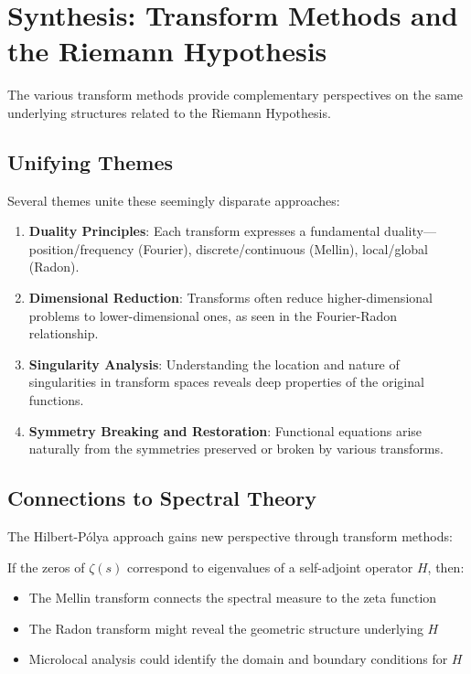 \section{Synthesis: Transform Methods and the Riemann Hypothesis}
\label{sec:synthesis-transforms-rh}

The various transform methods provide complementary perspectives on the same underlying structures related to the Riemann Hypothesis.

\subsection{Unifying Themes}

Several themes unite these seemingly disparate approaches:

\begin{enumerate}
\item \textbf{Duality Principles}: Each transform expresses a fundamental duality—position/frequency (Fourier), discrete/continuous (Mellin), local/global (Radon).

\item \textbf{Dimensional Reduction}: Transforms often reduce higher-dimensional problems to lower-dimensional ones, as seen in the Fourier-Radon relationship.

\item \textbf{Singularity Analysis}: Understanding the location and nature of singularities in transform spaces reveals deep properties of the original functions.

\item \textbf{Symmetry Breaking and Restoration}: Functional equations arise naturally from the symmetries preserved or broken by various transforms.
\end{enumerate}

\subsection{Connections to Spectral Theory}

The Hilbert-Pólya approach gains new perspective through transform methods:

\begin{remark}
If the zeros of $\zeta(s)$ correspond to eigenvalues of a self-adjoint operator $H$, then:
\begin{itemize}
\item The Mellin transform connects the spectral measure to the zeta function
\item The Radon transform might reveal the geometric structure underlying $H$
\item Microlocal analysis could identify the domain and boundary conditions for $H$
\end{itemize}
\end{remark}

